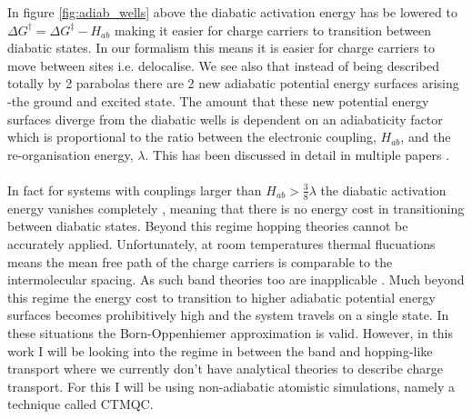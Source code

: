 In figure \ref{fig:adiab_wells} above the diabatic activation energy has be lowered to $\Delta G^{\dagger} = \Delta G^{\ddagger} - H_{ab}$ making it easier for charge carriers to transition between diabatic states. In our formalism this means it is easier for charge carriers to move between sites i.e. delocalise. We see also that instead of being described totally by 2 parabolas there are 2 new adiabatic potential energy surfaces arising -the ground and excited state. The amount that these new potential energy surfaces diverge from the diabatic wells is dependent on an adiabaticity factor which is proportional to the ratio between the electronic coupling, $H_{ab}$, and the re-organisation energy, $\lambda$. This has been discussed in detail in multiple papers \cite{oberhofer_charge_2017, spencer_fob-sh:_2016, spencer_confronting_2016,   Gajdos2013Mar} .
\\\\
In fact for systems with couplings larger than $H_{ab} > \frac{3}{8} \lambda$ the diabatic activation energy vanishes completely \cite{Gajdos2013Mar}, meaning that there is no energy cost in transitioning between diabatic states. Beyond this regime hopping theories cannot be accurately applied. Unfortunately, at room temperatures thermal flucuations means the mean free path of the charge carriers is comparable to the intermolecular spacing. As such band theories too are inapplicable
\cite{oberhofer_charge_2017, gajdos_ultrafast_2014, Gershenson2006Sep}. Much beyond this regime the energy cost to transition to higher adiabatic potential energy surfaces becomes prohibitively high and the system travels on a single state. In these situations the Born-Oppenhiemer approximation is valid. However, in this work I will be looking into the regime in between the band and hopping-like transport where we currently don't have  analytical theories to describe charge transport. For this I will be using non-adiabatic atomistic simulations, namely a technique called CTMQC.
